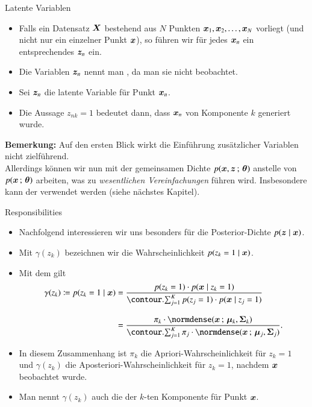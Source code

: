 \begin{frame}{Latente Variablen}{}
	\begin{itemize}
		\item Falls ein Datensatz $\bm{X}$ bestehend aus $N$ Punkten $\bm{x}_1, \bm{x}_2, \ldots, \bm{x}_N$ vorliegt
			(und nicht nur ein einzelner Punkt $\bm{x}$), so führen wir für jedes $\bm{x}_n$ ein entsprechendes $\bm{z}_n$ ein.
		\item Die Variablen $\bm{z}_n$ nennt man , da man sie nicht beobachtet.
		\item Sei $\bm{z}_n$ die latente Variable für Punkt $\bm{x}_n$.
		\item Die Aussage $z_{nk} = 1$ bedeutet dann, dass $\bm{x}_n$ von Komponente $k$ generiert wurde.
	\end{itemize}
	
	\begin{boxGray}
		\textbf{Bemerkung:} Auf den ersten Blick wirkt die Einführung zusätzlicher Variablen nicht zielführend. \\
		Allerdings können wir nun mit der gemeinsamen Dichte $p(\bm{x}, \bm{z} \,;\, \bm{\theta})$ anstelle von $p(\bm{x} \,;\, \bm{\theta})$ arbeiten,
		was zu \textit{wesentlichen Vereinfachungen} führen wird.
		Insbesondere kann der  verwendet werden (siehe nächstes Kapitel).
	\end{boxGray}
\end{frame}


\begin{frame}{Responsibilities}{}
	\begin{itemize}
		\item Nachfolgend interessieren wir uns besonders für die Posterior-Dichte $p(\bm{z} \mid \bm{x})$.
		\item Mit $\gamma(z_k)$ bezeichnen wir die Wahrscheinlichkeit $p(z_k = 1 \mid \bm{x})$.
		\item Mit dem  gilt
		\begin{equation} \label{eq:gmm-responsibilities}
			\begin{aligned}
				\gamma(z_k) \coloneqq p(z_k = 1 \mid \bx)
					&= \frac{p(z_k = 1) \cdot p(\bx \mid z_k = 1)}{\sum_{j=1}^K p(z_j = 1) \cdot p(\bx \mid z_j = 1)}
			\\[3mm]
					&= \frac{\pi_k \cdot \normdense(\bx \param \bmu_k, \bSigma_k)}{%
						\sum_{j=1}^K \pi_j \cdot \normdense(\bx \param \bmu_j, \bSigma_j)
					}.
			\end{aligned}
		\end{equation}
		\item In diesem Zusammenhang ist $\pi_k$ die Apriori-Wahrscheinlichkeit für $z_k = 1$ und
			$\gamma(z_k)$ die Aposteriori-Wahrscheinlichkeit für $z_k = 1$, nachdem $\bm{x}$ beobachtet wurde.
		\item Man nennt $\gamma(z_k)$ auch die  der $k$-ten Komponente für Punkt $\bm{x}$. 
	\end{itemize}
\end{frame}


